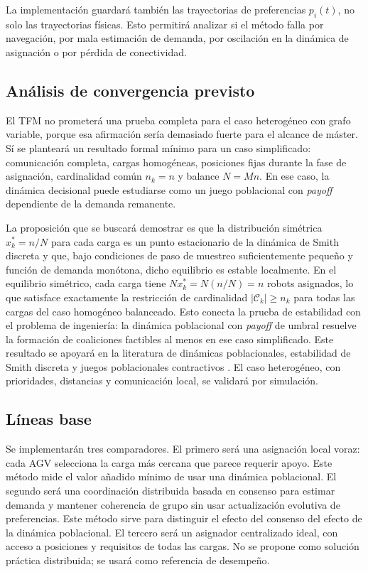 \documentclass[11pt,a4paper]{article}
\begin{document}
La implementación guardará también las trayectorias de preferencias $p_i(t)$, no solo las trayectorias físicas. Esto permitirá analizar si el método falla por navegación, por mala estimación de demanda, por oscilación en la dinámica de asignación o por pérdida de conectividad.

\subsection{Análisis de convergencia previsto}

El TFM no prometerá una prueba completa para el caso heterogéneo con grafo variable, porque esa afirmación sería demasiado fuerte para el alcance de máster. Sí se planteará un resultado formal mínimo para un caso simplificado: comunicación completa, cargas homogéneas, posiciones fijas durante la fase de asignación, cardinalidad común $n_k=n$ y balance $N=Mn$. En ese caso, la dinámica decisional puede estudiarse como un juego poblacional con \textit{payoff} dependiente de la demanda remanente.

La proposición que se buscará demostrar es que la distribución simétrica $x_k^\ast=n/N$ para cada carga es un punto estacionario de la dinámica de Smith discreta y que, bajo condiciones de paso de muestreo suficientemente pequeño y función de demanda monótona, dicho equilibrio es estable localmente. En el equilibrio simétrico, cada carga tiene $N x_k^\ast=N(n/N)=n$ robots asignados, lo que satisface exactamente la restricción de cardinalidad $|\mathcal{C}_k|\geq n_k$ para todas las cargas del caso homogéneo balanceado. Esto conecta la prueba de estabilidad con el problema de ingeniería: la dinámica poblacional con \textit{payoff} de umbral resuelve la formación de coaliciones factibles al menos en ese caso simplificado. Este resultado se apoyará en la literatura de dinámicas poblacionales, estabilidad de Smith discreta y juegos poblacionales contractivos \citep{sandholm2010population,martinez2020formation,martinez2022contractive}. El caso heterogéneo, con prioridades, distancias y comunicación local, se validará por simulación.

\subsection{Líneas base}

Se implementarán tres comparadores. El primero será una asignación local voraz: cada AGV selecciona la carga más cercana que parece requerir apoyo. Este método mide el valor añadido mínimo de usar una dinámica poblacional. El segundo será una coordinación distribuida basada en consenso para estimar demanda y mantener coherencia de grupo sin usar actualización evolutiva de preferencias. Este método sirve para distinguir el efecto del consenso del efecto de la dinámica poblacional. El tercero será un asignador centralizado ideal, con acceso a posiciones y requisitos de todas las cargas. No se propone como solución práctica distribuida; se usará como referencia de desempeño.
\end{document}
